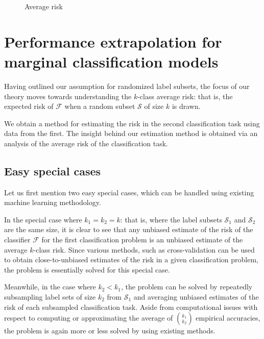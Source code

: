 \documentclass[12pt]{article}
\begin{document}
\begin{figure}[h]
\centering
\caption{Average risk}\label{fig:average_risk}
\end{figure}






\section{Performance extrapolation for marginal classification models}
\label{sec:extrapolation}

Having outlined our assumption for randomized label subsets, the focus
of our theory moves towards understanding the $k$-class average risk:
that is, the expected risk of $\mathcal{F}$ when a random subset
$\mathcal{S}$ of size $k$ is drawn.

We obtain a method for estimating the risk in the second
classification task using data from the first.  The insight behind our
estimation method is obtained via an analysis of the average risk of
the classification task.

\subsection{Easy special cases}

Let us first mention two easy special cases, which can be handled
using existing machine learning methodology.

In the special case where $k_1 = k_2 = k$: that is, where the label
subsets $\mathcal{S}_1$ and $\mathcal{S}_2$ are the same size, it is
clear to see that any unbiased estimate of the risk of the classifier
$\mathcal{F}$ for the first classification problem is an unbiased
estimate of the average $k$-class risk.  Since various methods, such
as cross-validation can be used to obtain close-to-unbiased estimates
of the risk in a given classification problem, the problem is
essentially solved for this special case.

Meanwhile, in the case where $k_2 < k_1$, the problem can be solved by
repeatedly subsampling label sets of size $k_2$ from $\mathcal{S}_1$
and averaging unbiased estimates of the risk of each subsampled
classification task.  Aside from computational issues with respect to
computing or approximating the average of ${k_1}\choose{k_2}$
empirical accuracies, the problem is again more or less solved by
using existing methods.
\end{document}
